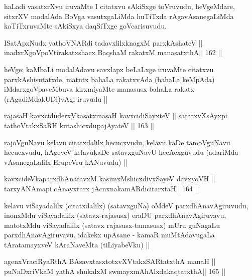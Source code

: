 \begin{artha}
haLadi vasatxrXvu iruvaMte I citatxvu sAkiSxge toVruvudu, heVgeMdare,
sitxrXV modalAda BoVga vasutxgaLiMda huTiTxda rAgavAsanegaLiMda
kaTiTxruvaMte sAkiSxya daqSiTxge goVcarisuvudu.
\end{artha}


\begin{shl}
ISatApxNudx yathoVNARdi tadavxlilxknagxM parxkAshateV ||
inadxrXgoVpoV\s tirakatxshacx BaqshaM rakatxM manasatxthA\hfill || 162 ||
\end{shl}

\begin{artha}
heVge; kaMbaLi modalAdavu savxlapx beLaLxge iruvaMte citatxvu
parxkAshisutatxde, matutx bahaLa rakatxvAda (bahaLa keMpAda)
iMdarxgoVpaveMbuva kirxmiyaMte manasusx bahaLa rakatx
(rAgadiMdakUDi)vAgi iruvudu ||
\end{artha}


\begin{shl}
rajasaH kavxciduderxVkasatxmasaH kavxcidiSayxteV ||
satatxvXsAyxpi tathoVtakxSaRH kutashicxdupajAyateV ||  163 ||
\end{shl}

\begin{artha}
rajoVguNavu kelavu citatxdalilx hecucxvudu, kelavu kaDe tamoVguNavu
hecucxvudu, hAgeyeV kelavukaDe satavxguNavU hecAcxguvudu (adariMda
vAsanegaLalilx ErupeVru kANuvudu) ||
\end{artha}

\begin{shl}
kavxcideVkaparxdhAnatavxM kasimxMshicxdivxSayeV davxyoVH ||
tarxyANAmapi cAnayxtarx jAcnxnakamARdicitarxtaH\hfill || 164 ||
\end{shl}

\begin{artha}
kelavu viSayadalilx (citatxdalilx) (satavxguNa) oMdeV
parxdhAnavAgiruvudu, inonxMdu viSayadalilx (satavx-rajasusx) eraDU
parxdhAnavAgiruvavu, matotxMdu viSayadalilx (satavx rajasusx-tamasusx)
mUru guNagaLu parxdhAnavAgiruvavu. idakekx upAsane - kamaR
muMtAdavugaLa tAratamayxveV kAraNaveMta (tiLiyabeVku) ||
\end{artha}


\begin{shl}
agenxVraciRyaRthA BAsavxtasxtotxvXVtakxSARtatxthA manaH ||
puNaDxriVkaM yathA shukalxM swmayxmAhAlxdakaqtatxthA\hfill || 165 ||
\end{shl}

